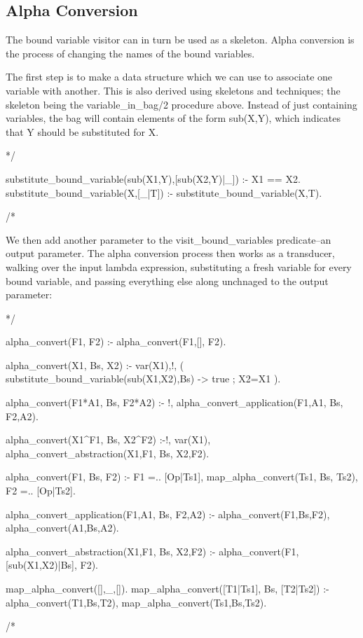\documentclass{book}[9pt]
\newenvironment{code}%
{\small \verbatim}%
{\endverbatim \large}
\begin{document}
\subsection{Alpha Conversion}

The bound variable visitor can in turn be used as a skeleton.  Alpha
conversion is the process of changing the names of the bound
variables.

The first step is to make a data structure which we can use to
associate one variable with another.  This is also derived using
skeletons and techniques; the skeleton being the variable\_in\_bag/2
procedure above.  Instead of just containing variables, the bag will
contain elements of the form sub(X,Y), which indicates that Y should
be substituted for X.

\begin{code}
*/

substitute_bound_variable(sub(X1,Y),[sub(X2,Y)|_]) :- X1 == X2.
substitute_bound_variable(X,[_|T]) :- substitute_bound_variable(X,T).

/*
\end{code}

We then add another parameter to the visit\_bound\_variables
predicate--an output parameter.  The alpha conversion process then
works as a transducer, walking over the input lambda expression,
substituting a fresh variable for every bound variable, and passing
everything else along unchnaged to the output parameter:

\begin{code}
*/

alpha_convert(F1, F2) :- alpha_convert(F1,[], F2).

alpha_convert(X1, Bs, X2) :- var(X1),!,
        ( substitute_bound_variable(sub(X1,X2),Bs) ->
            true
        ;
            X2=X1
        ).

alpha_convert(F1*A1, Bs, F2*A2) :- !,
        alpha_convert_application(F1,A1, Bs, F2,A2).

alpha_convert(X1^F1, Bs, X2^F2) :-!,
        var(X1),
        alpha_convert_abstraction(X1,F1, Bs, X2,F2).

alpha_convert(F1, Bs, F2) :-
        F1 =.. [Op|Ts1],
        map_alpha_convert(Ts1, Bs, Ts2),
        F2 =.. [Op|Ts2].

alpha_convert_application(F1,A1, Bs, F2,A2) :-
        alpha_convert(F1,Bs,F2),
        alpha_convert(A1,Bs,A2).

alpha_convert_abstraction(X1,F1, Bs, X2,F2) :-
        alpha_convert(F1, [sub(X1,X2)|Bs], F2).

map_alpha_convert([],_,[]).
map_alpha_convert([T1|Ts1], Bs, [T2|Ts2]) :-
        alpha_convert(T1,Bs,T2),
        map_alpha_convert(Ts1,Bs,Ts2).

/*
\end{code}
\end{document}
